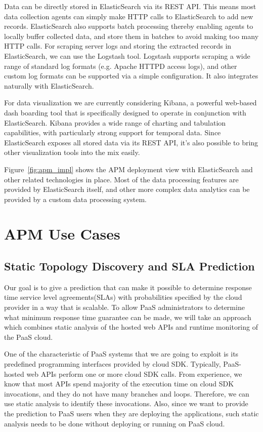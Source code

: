 \documentclass[11pt]{article}
\begin{document}
Data can be directly stored in ElasticSearch via its REST API. This means most data collection agents can 
simply make HTTP calls to ElasticSearch to add new records. ElasticSearch also supports batch 
processing thereby enabling agents to locally buffer collected data, and store them in batches to avoid
making too many HTTP calls. For scraping server logs and storing the extracted records in ElasticSearch,
we can use the Logstash tool. Logstash supports scraping a wide range of standard log formats (e.g. 
Apache HTTPD access logs), and other custom log formats can be supported via a simple configuration.
It also integrates naturally with ElasticSearch.

For data visualization we are currently considering Kibana, a powerful web-based dash boarding tool 
that is specifically designed to operate in conjunction with ElasticSearch. Kibana provides a wide
range of charting and tabulation capabilities, with particularly strong support for temporal data.  Since
ElasticSearch exposes all stored data via its REST API, it's also possible to bring other visualization
tools into the mix easily.

Figure~\ref{fig:apm_impl} shows the APM deployment view with ElasticSearch and other related technologies
in place. Most of the data processing features are provided by ElasticSearch itself, and other more complex
data analytics can be provided by a custom data processing system. 

\section{APM Use Cases}
\subsection{Static Topology Discovery and SLA Prediction}
Our goal is to give a prediction that can make it possible to determine response time service level agreements(SLAs)
with probabilities specified by the cloud provider in a way that is scalable. To allow PaaS administrators to
determine what minimum response time guarantee can be made, we will take an approach which combines static analysis
of the hosted web APIs and runtime monitoring of the PaaS cloud.

One of the characteristic of PaaS systems that we are going to exploit is its predefined programming interfaces provided
by cloud SDK. Typically, PaaS-hosted web APIs perform one or more cloud SDK calls. From experience, we know that most APIs
spend majority of the execution time on cloud SDK invocations, and they do not have many branches and loops. Therefore,
we can use static analysis to identify these invocations. Also, since we want to provide the prediction to PaaS users when
they are deploying the applications, such static analysis needs to be done without deploying or running on PaaS cloud. 
\end{document}
